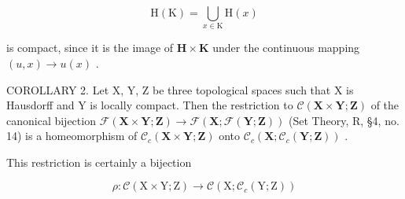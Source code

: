 \[
\mathrm{H} (\mathrm{K}) = \bigcup_ {x \in \mathrm{K}} \mathrm{H} (x)
\]

is compact, since it is the image of \(\mathbf{H} \times \mathbf{K}\) under the continuous mapping \((u, x) \to u(x)\) .

COROLLARY 2. Let X, Y, Z be three topological spaces such that X is Hausdorff and Y is locally compact. Then the restriction to \(\mathcal{C}(\mathbf{X} \times \mathbf{Y}; \mathbf{Z})\) of the canonical bijection \(\mathcal{F}(\mathbf{X} \times \mathbf{Y}; \mathbf{Z}) \to \mathcal{F}(\mathbf{X}; \mathcal{F}(\mathbf{Y}; \mathbf{Z}))\) (Set Theory, R, §4, no. 14) is a homeomorphism of \(\mathcal{C}_c(\mathbf{X} \times \mathbf{Y}; \mathbf{Z})\) onto \(\mathcal{C}_c(\mathbf{X}; \mathcal{C}_c(\mathbf{Y}; \mathbf{Z}))\) .

This restriction is certainly a bijection

\[
\rho : \mathcal {C} (\mathrm{X} \times \mathrm{Y}; \mathrm{Z}) \rightarrow \mathcal {C} (\mathrm{X}; \mathcal {C} _ {c} (\mathrm{Y}; \mathrm{Z}))
\]

